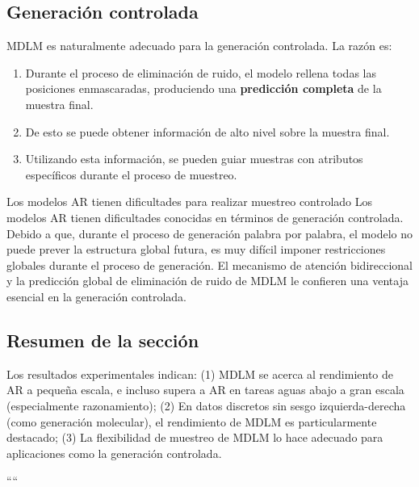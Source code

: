 \subsection{Generación controlada}

MDLM es naturalmente adecuado para la generación controlada. La razón es:

\begin{enumerate}
    \item Durante el proceso de eliminación de ruido, el modelo rellena todas las posiciones enmascaradas, produciendo una \textbf{predicción completa} de la muestra final.
    \item De esto se puede obtener información de alto nivel sobre la muestra final.
    \item Utilizando esta información, se pueden guiar muestras con atributos específicos durante el proceso de muestreo.
\end{enumerate}

\begin{warningbox}{Los modelos AR tienen dificultades para realizar muestreo controlado}
Los modelos AR tienen dificultades conocidas en términos de generación controlada. Debido a que, durante el proceso de generación palabra por palabra, el modelo no puede prever la estructura global futura, es muy difícil imponer restricciones globales durante el proceso de generación. El mecanismo de atención bidireccional y la predicción global de eliminación de ruido de MDLM le confieren una ventaja esencial en la generación controlada.
\end{warningbox}

\subsection{Resumen de la sección}

Los resultados experimentales indican: (1) MDLM se acerca al rendimiento de AR a pequeña escala, e incluso supera a AR en tareas aguas abajo a gran escala (especialmente razonamiento); (2) En datos discretos sin sesgo izquierda-derecha (como generación molecular), el rendimiento de MDLM es particularmente destacado; (3) La flexibilidad de muestreo de MDLM lo hace adecuado para aplicaciones como la generación controlada.

\newpage

````
